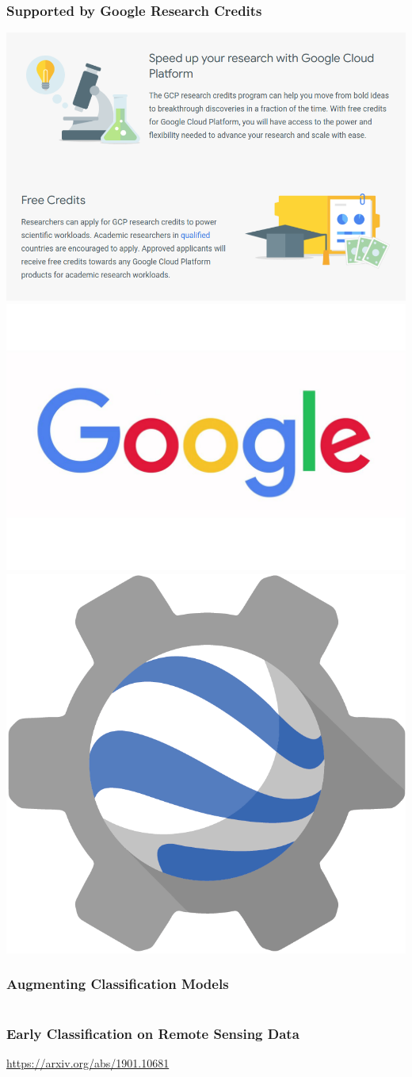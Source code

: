 \begin{frame}
\frametitle{Supported by Google Research Credits}

\includegraphics[width=.3\textwidth]{images/google_research_credits}
\includegraphics[width=.3\textwidth]{images/google}
\includegraphics[width=.2\textwidth]{images/earth-engine-logo}


\end{frame}


\begin{frame}
\frametitle{Augmenting Classification Models}

\begin{columns}
	
	\begin{center}
		
		
	\end{center}
	
	
	
\end{columns}

\end{frame}


%	
%	
%	


\begin{frame}
\frametitle{Early Classification on Remote Sensing Data}


\url{https://arxiv.org/abs/1901.10681}


\end{frame}


